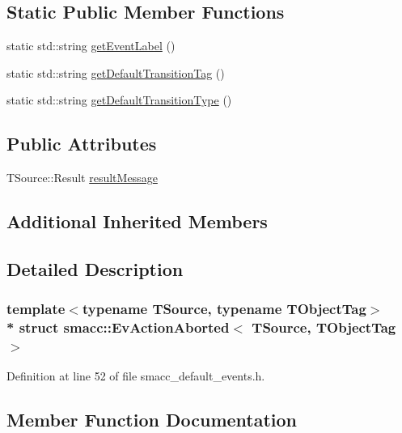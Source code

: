 \subsection*{Static Public Member Functions}
\begin{DoxyCompactItemize}
\item 
static std\+::string \hyperlink{structsmacc_1_1EvActionAborted_afc9da88d5363116570d72f40b488616b}{get\+Event\+Label} ()
\item 
static std\+::string \hyperlink{structsmacc_1_1EvActionAborted_ad7b74030e2d6b7a0283de468999af421}{get\+Default\+Transition\+Tag} ()
\item 
static std\+::string \hyperlink{structsmacc_1_1EvActionAborted_a840d23255ba65123402c5afbecf75f65}{get\+Default\+Transition\+Type} ()
\end{DoxyCompactItemize}
\subsection*{Public Attributes}
\begin{DoxyCompactItemize}
\item 
T\+Source\+::\+Result \hyperlink{structsmacc_1_1EvActionAborted_acbade691390eb625282f93139a4b9f33}{result\+Message}
\end{DoxyCompactItemize}
\subsection*{Additional Inherited Members}


\subsection{Detailed Description}
\subsubsection*{template$<$typename T\+Source, typename T\+Object\+Tag$>$\\*
struct smacc\+::\+Ev\+Action\+Aborted$<$ T\+Source, T\+Object\+Tag $>$}



Definition at line 52 of file smacc\+\_\+default\+\_\+events.\+h.



\subsection{Member Function Documentation}

